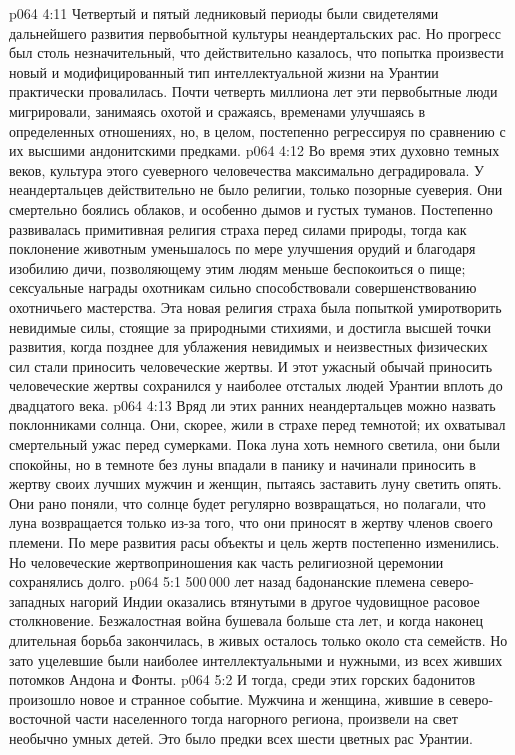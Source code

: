 \vs p064 4:11 Четвертый и пятый ледниковый периоды были свидетелями дальнейшего развития первобытной культуры неандертальских рас. Но прогресс был столь незначительный, что действительно казалось, что попытка произвести новый и модифицированный тип интеллектуальной жизни на Урантии практически провалилась. Почти четверть миллиона лет эти первобытные люди мигрировали, занимаясь охотой и сражаясь, временами улучшаясь в определенных отношениях, но, в целом, постепенно регрессируя по сравнению с их высшими андонитскими предками.
\vs p064 4:12 \pc Во время этих духовно темных веков, культура этого суеверного человечества максимально деградировала. У неандертальцев действительно не было религии, только позорные суеверия. Они смертельно боялись облаков, и особенно дымов и густых туманов. Постепенно развивалась примитивная религия страха перед силами природы, тогда как поклонение животным уменьшалось по мере улучшения орудий и благодаря изобилию дичи, позволяющему этим людям меньше беспокоиться о пище; сексуальные награды охотникам сильно способствовали совершенствованию охотничьего мастерства. Эта новая религия страха была попыткой умиротворить невидимые силы, стоящие за природными стихиями, и достигла высшей точки развития, когда позднее для ублажения невидимых и неизвестных физических сил стали приносить человеческие жертвы. И этот ужасный обычай приносить человеческие жертвы сохранился у наиболее отсталых людей Урантии вплоть до двадцатого века.
\vs p064 4:13 Вряд ли этих ранних неандертальцев можно назвать поклонниками солнца. Они, скорее, жили в страхе перед темнотой; их охватывал смертельный ужас перед сумерками. Пока луна хоть немного светила, они были спокойны, но в темноте без луны впадали в панику и начинали приносить в жертву своих лучших мужчин и женщин, пытаясь заставить луну светить опять. Они рано поняли, что солнце будет регулярно возвращаться, но полагали, что луна возвращается только из\hyp{}за того, что они приносят в жертву членов своего племени. По мере развития расы объекты и цель жертв постепенно изменились. Но человеческие жертвоприношения как часть религиозной церемонии сохранялись долго.
\vs p064 5:1 500\,000 лет назад бадонанские племена северо\hyp{}западных нагорий Индии оказались втянутыми в другое чудовищное расовое столкновение. Безжалостная война бушевала больше ста лет, и когда наконец длительная борьба закончилась, в живых осталось только около ста семейств. Но зато уцелевшие были наиболее интеллектуальными и нужными, из всех живших потомков Андона и Фонты.
\vs p064 5:2 И тогда, среди этих горских бадонитов произошло новое и странное событие. Мужчина и женщина, жившие в северо\hyp{}восточной части населенного тогда нагорного региона,  произвели на свет необычно умных детей. Это было  предки всех шести цветных рас Урантии.
